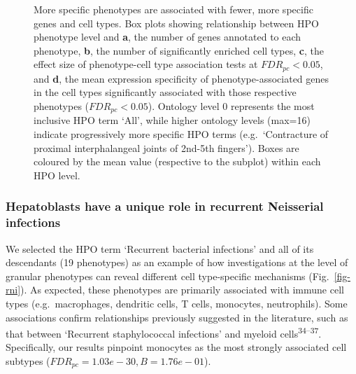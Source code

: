 \documentclass[
]{agujournal2019}
\begin{document}
\label{cell-fig-ontology-lvl}
\begin{figure}[H]


\caption{\label{fig-ontology-lvl}More specific phenotypes are associated
with fewer, more specific genes and cell types. Box plots showing
relationship between HPO phenotype level and \textbf{a}, the number of
genes annotated to each phenotype, \textbf{b}, the number of
significantly enriched cell types, \textbf{c}, the effect size of
phenotype-cell type association tests at \(FDR_{pc}<0.05\), and
\textbf{d}, the mean expression specificity of phenotype-associated
genes in the cell types significantly associated with those respective
phenotypes (\(FDR_{pc}<0.05\)). Ontology level 0 represents the most
inclusive HPO term `All', while higher ontology levels (max=16) indicate
progressively more specific HPO terms (e.g.~`Contracture of proximal
interphalangeal joints of 2nd-5th fingers'). Boxes are coloured by the
mean value (respective to the subplot) within each HPO level.}

\end{figure}%

\subsubsection{Hepatoblasts have a unique role in recurrent Neisserial
infections}\label{hepatoblasts-have-a-unique-role-in-recurrent-neisserial-infections}

We selected the HPO term `Recurrent bacterial infections' and all of its
descendants (19 phenotypes) as an example of how investigations at the
level of granular phenotypes can reveal different cell type-specific
mechanisms (Fig.~\ref{fig-rni}). As expected, these phenotypes are
primarily associated with immune cell types (e.g.~macrophages, dendritic
cells, T cells, monocytes, neutrophils). Some associations confirm
relationships previously suggested in the literature, such as that
between `Recurrent staphylococcal infections' and myeloid
cells\textsuperscript{34--37}. Specifically, our results pinpoint
monocytes as the most strongly associated cell subtypes
(\(FDR_{pc}= 1.03e-30,B= 1.76e-01\)).
\end{document}
